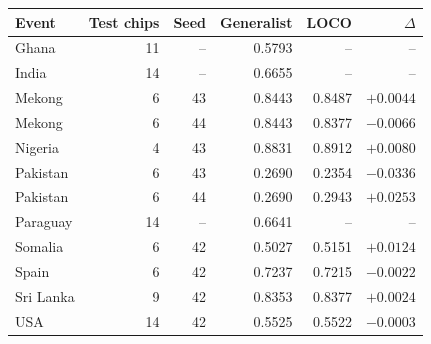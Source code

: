 \begin{tabular}{@{}lrrrrr@{}}
\toprule
Event & Test chips & Seed & Generalist & LOCO & $\Delta$ \\
\midrule
Ghana & 11 & -- & 0.5793 & -- & -- \\
India & 14 & -- & 0.6655 & -- & -- \\
Mekong & 6 & 43 & 0.8443 & 0.8487 & $+0.0044$ \\
Mekong & 6 & 44 & 0.8443 & 0.8377 & $-0.0066$ \\
Nigeria & 4 & 43 & 0.8831 & 0.8912 & $+0.0080$ \\
Pakistan & 6 & 43 & 0.2690 & 0.2354 & $-0.0336$ \\
Pakistan & 6 & 44 & 0.2690 & 0.2943 & $+0.0253$ \\
Paraguay & 14 & -- & 0.6641 & -- & -- \\
Somalia & 6 & 42 & 0.5027 & 0.5151 & $+0.0124$ \\
Spain & 6 & 42 & 0.7237 & 0.7215 & $-0.0022$ \\
Sri Lanka & 9 & 42 & 0.8353 & 0.8377 & $+0.0024$ \\
USA & 14 & 42 & 0.5525 & 0.5522 & $-0.0003$ \\
\bottomrule
\end{tabular}
